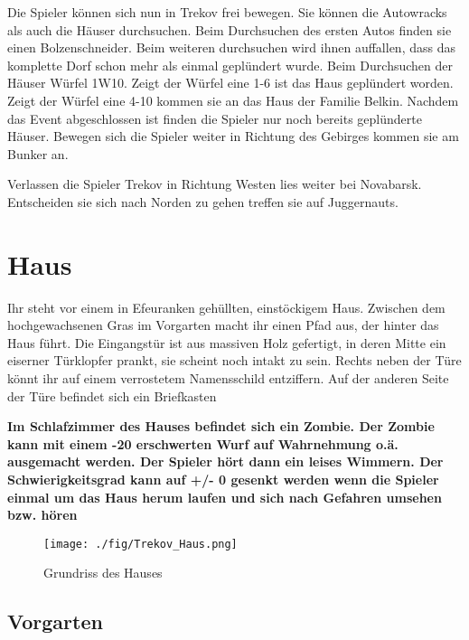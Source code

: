 
Die Spieler können sich nun in Trekov frei bewegen. Sie können die Autowracks als auch die Häuser durchsuchen. Beim Durchsuchen des ersten Autos finden sie einen Bolzenschneider. Beim weiteren durchsuchen wird ihnen auffallen, dass das komplette Dorf schon mehr als einmal geplündert wurde. Beim Durchsuchen der Häuser Würfel 1W10. Zeigt der Würfel eine 1-6 ist das Haus geplündert worden.
\\Zeigt der Würfel eine 4-10 kommen sie an das Haus der Familie Belkin. Nachdem das Event abgeschlossen ist finden die Spieler nur noch bereits geplünderte Häuser. Bewegen sich die Spieler weiter in Richtung des Gebirges kommen sie am Bunker an.

Verlassen die Spieler Trekov in Richtung Westen lies weiter bei Novabarsk. Entscheiden sie sich nach Norden zu gehen treffen sie auf Juggernauts.

\section{Haus}

Ihr steht vor einem in Efeuranken gehüllten, einstöckigem Haus. Zwischen dem hochgewachsenen Gras im Vorgarten macht ihr einen Pfad aus, der hinter das Haus führt. Die Eingangstür ist aus massiven Holz gefertigt, in deren Mitte ein eiserner Türklopfer prankt, sie scheint noch intakt zu sein. Rechts neben der Türe könnt ihr auf einem verrostetem Namensschild  entziffern. Auf der anderen Seite der Türe befindet sich ein Briefkasten

\textbf{Im Schlafzimmer des Hauses befindet sich ein Zombie. Der Zombie kann mit einem -20 erschwerten Wurf auf Wahrnehmung o.ä. ausgemacht werden. Der Spieler hört dann ein leises Wimmern. Der Schwierigkeitsgrad kann auf +/- 0 gesenkt werden wenn die Spieler einmal um das Haus herum laufen und sich nach Gefahren umsehen bzw. hören}

\begin{figure}[t]
	\begin{center}
		\texttt{[image: ./fig/Trekov\_Haus.png]}
		\caption{Grundriss des Hauses}
	\end{center}
\end{figure}

\subsection{Vorgarten}

